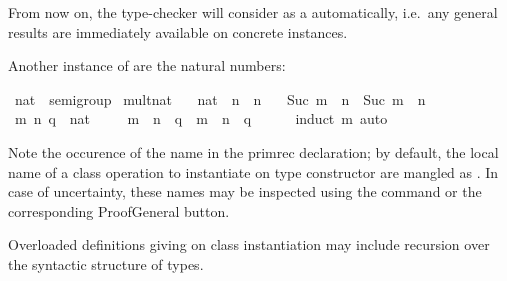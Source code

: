 \begin{isabellebody}
\begin{isamarkuptext}
  From now on, the type-checker will consider 
  as a  automatically, i.e.\ any general results
  are immediately available on concrete instances.

  \medskip Another instance of  are the natural numbers:%
\end{isamarkuptext}%
\isamarkuptrue%
%
\isadelimquote
%
\endisadelimquote
%
\isatagquote
{}\isamarkupfalse%
\ nat\ {\isacharcolon}{\isacharcolon}\ semigroup\isanewline
{}\isanewline
\isanewline
{}\isamarkupfalse%
\ mult{\isacharunderscore}nat\ \isanewline
\ \ {\isachardoublequoteopen}{\isacharparenleft}{}{\isasymColon}nat{\isacharparenright}\ {\isasymotimes}\ n\ {\isacharequal}\ n{\isachardoublequoteclose}\isanewline
\ \ {\isacharbar}\ {\isachardoublequoteopen}Suc\ m\ {\isasymotimes}\ n\ {\isacharequal}\ Suc\ {\isacharparenleft}m\ {\isasymotimes}\ n{\isacharparenright}{\isachardoublequoteclose}\isanewline
\isanewline
{}\isamarkupfalse%
\ \isamarkupfalse%
\isanewline
\ \ \isamarkupfalse%
\ m\ n\ q\ {\isacharcolon}{\isacharcolon}\ nat\ \isanewline
\ \ \isamarkupfalse%
\ {\isachardoublequoteopen}m\ {\isasymotimes}\ n\ {\isasymotimes}\ q\ {\isacharequal}\ m\ {\isasymotimes}\ {\isacharparenleft}n\ {\isasymotimes}\ q{\isacharparenright}{\isachardoublequoteclose}\isanewline
\ \ \ \ \isamarkupfalse%
\ {\isacharparenleft}induct\ m{\isacharparenright}\ auto\isanewline
{}\isamarkupfalse%
\isanewline
\isanewline
{}\isamarkupfalse%
%
\endisatagquote
{\isafoldquote}%
%
\isadelimquote
%
\endisadelimquote
%
\begin{isamarkuptext}%
\noindent Note the occurence of the name 
  in the primrec declaration;  by default, the local name of
  a class operation  to instantiate on type constructor
  \isa{{\isasymkappa}} are mangled as .  In case of uncertainty,
  these names may be inspected using the \hyperlink{command.print-context}{\mbox{}} command
  or the corresponding ProofGeneral button.%
\end{isamarkuptext}%
\isamarkuptrue%
%
\isamarkuptrue%
%
\begin{isamarkuptext}%
Overloaded definitions giving on class instantiation
  may include recursion over the syntactic structure of types.

\end{isamarkuptext}
\end{isabellebody}
